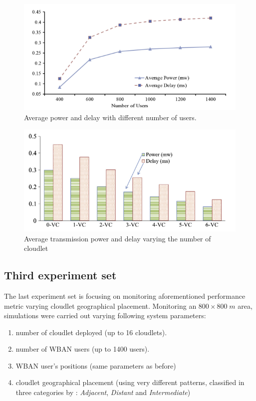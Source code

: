 \documentclass[sigchi]{acmart}
\begin{document}
\begin{figure}
  \includegraphics[width=\linewidth]{Set2.1.png}
  \caption{Average power and delay with different number of users.}
  \label{fig:model}
\end{figure}

\begin{figure}
  \includegraphics[width=\linewidth]{Set2.2.png}
  \caption{Average transmission power and delay varying the number of cloudlet}
  \label{fig:model}
\end{figure}

\subsection{Third experiment set}

The last experiment set is focusing on monitoring aforementioned performance metric varying cloudlet geographical placement. Monitoring an $800 \times 800 \; m$ area, simulations were carried out varying following system parameters:

\begin{enumerate}
\item number of cloudlet deployed (up to 16 cloudlets).
\item number of WBAN users (up to 1400 users).
\item WBAN user's positions (same parameters as before)
\item cloudlet geographical placement (using very different patterns, classified in three categories by \citet{MSAReport}: \textit{Adjacent}, \textit{Distant} and \textit{Intermediate})
\end{enumerate}
\end{document}
